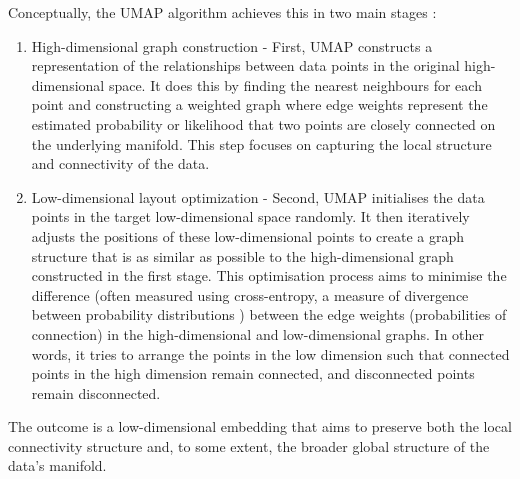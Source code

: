 \documentclass[10pt,oneside]{report}
\begin{document}
\noindent Conceptually, the UMAP algorithm achieves this in two main stages \cite{mcinnes2018umap}:
\begin{enumerate}
    \item High-dimensional graph construction - First, UMAP constructs a representation of the relationships between data points in the original high-dimensional space. It does this by finding the nearest neighbours for each point and constructing a weighted graph where edge weights represent the estimated probability or likelihood that two points are closely connected on the underlying manifold. This step focuses on capturing the local structure and connectivity of the data.
    \item Low-dimensional layout optimization - Second, UMAP initialises the data points in the target low-dimensional space randomly. It then iteratively adjusts the positions of these low-dimensional points to create a graph structure that is as similar as possible to the high-dimensional graph constructed in the first stage. This optimisation process aims to minimise the difference (often measured using cross-entropy, a measure of divergence between probability distributions \cite{zhang2018generalized}) between the edge weights (probabilities of connection) in the high-dimensional and low-dimensional graphs. In other words, it tries to arrange the points in the low dimension such that connected points in the high dimension remain connected, and disconnected points remain disconnected.
\end{enumerate}

The outcome is a low-dimensional embedding that aims to preserve both the local connectivity structure and, to some extent, the broader global structure of the data's manifold. 
\end{document}
